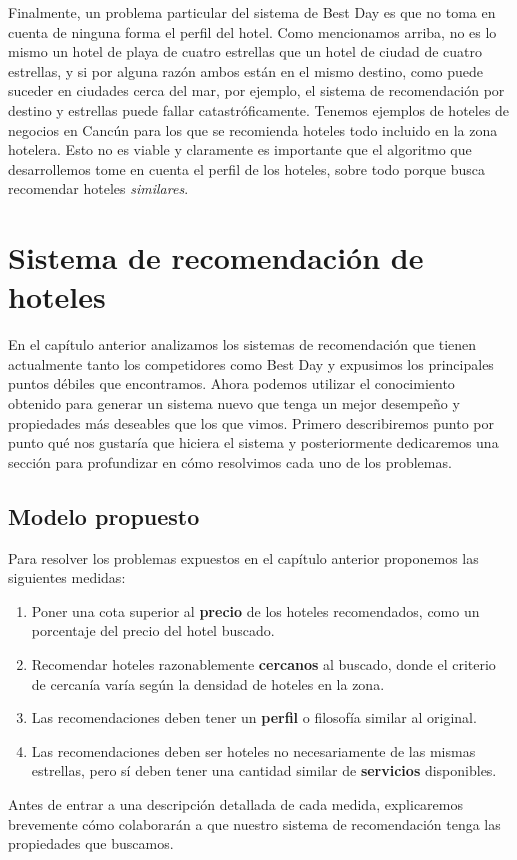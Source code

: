 \documentclass[12pt]{report}
\begin{document}
Finalmente, un problema particular del sistema de Best Day es que no toma en cuenta de ninguna forma el perfil del hotel. Como mencionamos arriba, no es lo mismo un hotel de playa de cuatro estrellas que un hotel de ciudad de cuatro estrellas, y si por alguna razón ambos están en el mismo destino, como puede suceder en ciudades cerca del mar, por ejemplo, el sistema de recomendación por destino y estrellas puede fallar catastróficamente. Tenemos ejemplos de hoteles de negocios en Cancún para los que se recomienda hoteles todo incluido en la zona hotelera. Esto no es viable y claramente es importante que el algoritmo que desarrollemos tome en cuenta el perfil de los hoteles, sobre todo porque busca recomendar hoteles \emph{similares}.

\chapter{Sistema de recomendación de hoteles}

En el capítulo anterior analizamos los sistemas de recomendación que tienen actualmente tanto los competidores como Best Day y expusimos los principales puntos débiles que encontramos. Ahora podemos utilizar el conocimiento obtenido para generar un sistema nuevo que tenga un mejor desempeño y propiedades más deseables que los que vimos. Primero describiremos punto por punto qué nos gustaría que hiciera el sistema y posteriormente dedicaremos una sección para profundizar en cómo resolvimos cada uno de los problemas.

\section{Modelo propuesto}

Para resolver los problemas expuestos en el capítulo anterior proponemos las siguientes medidas:
\begin{enumerate}
	\item Poner una cota superior al \textbf{precio} de los hoteles recomendados, como un porcentaje del precio del hotel buscado.
	\item Recomendar hoteles razonablemente \textbf{cercanos} al buscado, donde el criterio de cercanía varía según la densidad de hoteles en la zona.
	\item Las recomendaciones deben tener un \textbf{perfil} o filosofía similar al original.
	\item Las recomendaciones deben ser hoteles no necesariamente de las mismas estrellas, pero sí deben tener una cantidad similar de \textbf{servicios} disponibles.
\end{enumerate}
Antes de entrar a una descripción detallada de cada medida, explicaremos brevemente cómo colaborarán a que nuestro sistema de recomendación tenga las propiedades que buscamos.
\end{document}
